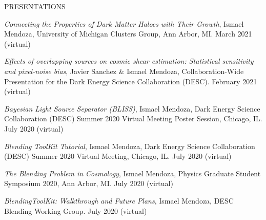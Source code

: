\begin{rSection}{PRESENTATIONS}
%
\vspace*{-1em}
\item \textit{Connecting the Properties of Dark Matter Haloes with Their Growth}, Ismael Mendoza, University of Michigan Clusters Group, Ann Arbor, MI. March 2021 (virtual)
%
\item \textit{Effects of overlapping sources on cosmic shear estimation: Statistical sensitivity and pixel-noise bias}, Javier Sanchez \& Ismael Mendoza, Collaboration-Wide Presentation for the Dark Energy Science Collaboration (DESC). February 2021 (virtual)
%
\item \textit{Bayesian Light Source Separator (BLISS)}, Ismael Mendoza, Dark Energy Science Collaboration (DESC) Summer 2020 Virtual Meeting Poster Session, Chicago, IL. July 2020 (virtual)
%
\item  \textit{Blending ToolKit Tutorial}, Ismael Mendoza, Dark Energy Science Collaboration (DESC) Summer 2020 Virtual Meeting, Chicago, IL. July 2020 (virtual)
%
\item \textit{The Blending Problem in Cosmology}, Ismael Mendoza, Physics Graduate Student Symposium 2020, Ann Arbor, MI. July 2020 (virtual)
%
\item \textit{BlendingToolKit: Walkthrough and Future Plans}, Ismael Mendoza, DESC Blending Working Group. July 2020 (virtual)
\end{rSection}

